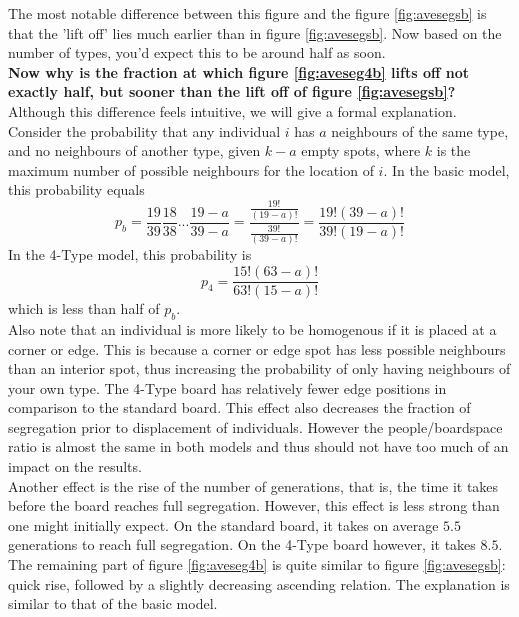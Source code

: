 The most notable difference between this figure and the figure \ref{fig:avesegsb} is that the 'lift off' lies much earlier than in figure \ref{fig:avesegsb}. Now based on the number of types, you'd expect this to be around half as soon.\\

\textbf{Now why is the fraction at which figure \ref{fig:aveseg4b} lifts off not exactly half, but sooner than the lift off of figure \ref{fig:avesegsb}?}\\
Although this difference feels intuitive, we will give a formal explanation. 
Consider the probability that any individual $i$ has $a$ neighbours of the same type, and no neighbours of another type, given $k-a$ empty spots, where $k$ is the maximum number of possible neighbours for the location of $i$. 
In the basic model, this probability equals
\[
p_b = \frac{19}{39}\frac{18}{38}...\frac{19-a}{39-a} = \frac{\frac{19!}{(19-a)!}}{\frac{39!}{(39-a)!}} = \frac{19!(39-a)!}{39!(19-a)!}
\]
In the 4-Type model, this probability is
\[
p_4 = \frac{15!(63-a)!}{63!(15-a)!}
\]
which is less than half of $p_b$.\\

Also note that an individual is more likely to be homogenous if it is placed at a corner or edge. 
This is because a corner or edge spot has less possible neighbours than an interior spot, thus increasing the probability of only having neighbours of your own type. 
The 4-Type board has relatively fewer edge positions in comparison to the standard board. This effect also decreases the fraction of segregation prior to displacement of individuals.
However the people/boardspace ratio is almost the same in both models and thus should not have too much of an impact on the results.\\

Another effect is the rise of the number of generations, that is, the time it takes before the board reaches full segregation. 
However, this effect is less strong than one might initially expect. 
On the standard board, it takes on average $5.5$ generations to reach full segregation. On the 4-Type board however, it takes $8.5$.\\

The remaining part of figure \ref{fig:aveseg4b} is quite similar to figure \ref{fig:avesegsb}: quick rise, followed by a slightly decreasing ascending relation. 
The explanation is similar to that of the basic model.
